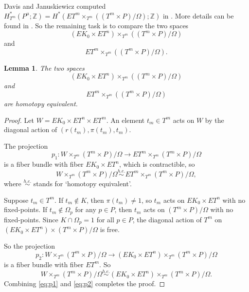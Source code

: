 \documentclass[12pt]{amsart}
\newtheorem{lemma}[theorem]{Lemma}
\theoremstyle{definition}
\numberwithin{equation}{section}
\begin{document}
Davis and Januskiewicz computed
$H_{T^m}^{*}(P^\mu;{{\mathbb{Z}}})=H^{*}(ET^m\times_{T^m}((T^m\times
P)/\Omega);{{\mathbb{Z}}})$ in \cite{DJ}. More details can be found in
\cite[434-436]{DJ}. So the remaining task is to compare the two
spaces\[(EK_{0}\times ET^n)\times_{T^m}((T^m\times P)/\Omega)\]
 and
\[ET^m\times_{T^m}((T^m\times P)/\Omega).\]

\begin{lemma}\label{lemma:AG Property}
The two spaces
\begin{equation}
(EK_{0}\times ET^n)\times_{T^m}((T^m\times P)/\Omega)
\end{equation}
and
\begin{equation}
ET^m\times_{T^m}((T^m\times P)/\Omega)
\end{equation}
are homotopy equivalent.
\end{lemma}

\begin{proof}
Let $W= EK_{0}\times ET^n\times ET^m$. An element $t_{m}\in T^m$
acts on $W$ by the diagonal action of $(r(t_{m}), \pi(t_{m}),
t_{m})$.

The projection
\begin{equation}\label{eq:pp1}
p_{1}: W\times_{T^m}(T^m\times P)/\Omega \rightarrow
ET^m\times_{T^m}(T^m\times P)/\Omega
\end{equation} is a fiber
bundle with fiber $EK_{0}\times ET^n$, which is contractible, so
\begin{equation}\label{eq:p1}
W\times_{T^m}(T^m\times P)/\Omega\stackrel{h.e.}{\sim}
ET^m\times_{T^m}(T^m\times P)/\Omega , \end{equation} where
$\stackrel{h.e.}{\sim}$ stands for `homotopy equivalent'.

Suppose $t_{m}\in T^m$. If $t_{m}\not\in K$, then $\pi(t_{m})\neq
1$, so $t_{m}$ acts on $EK_{0}\times ET^n$ with no fixed-points. If
$t_{m}\not\in \Omega_{p}$ for any $p\in P$, then $t_{m}$ acts on
$(T^m\times P)/\Omega$ with no fixed-points.  Since $K\cap
\Omega_{p}=1$ for all $p\in P$, the diagonal action of $T^m$  on
$(EK_{0}\times ET^n)\times (T^m\times P)/\Omega$ is free.

So the projection
\begin{equation}\label{eq:pp2}
p_{2}: W\times_{T^m}(T^m\times P)/\Omega \rightarrow (EK_{0}\times
ET^n)\times_{T^m} (T^m\times P)/\Omega
\end{equation}
is a fiber bundle with fiber $ET^m$. So
\begin{equation}\label{eq:p2}
W\times_{T^m}(T^m\times P)/\Omega \stackrel{h.e.}{\sim}
(EK_{0}\times ET^n)\times_{T^m} (T^m\times P)/\Omega.
\end{equation}
Combining \eqref{eq:p1} and \eqref{eq:p2} completes the proof.
\end{proof}
\end{document}
